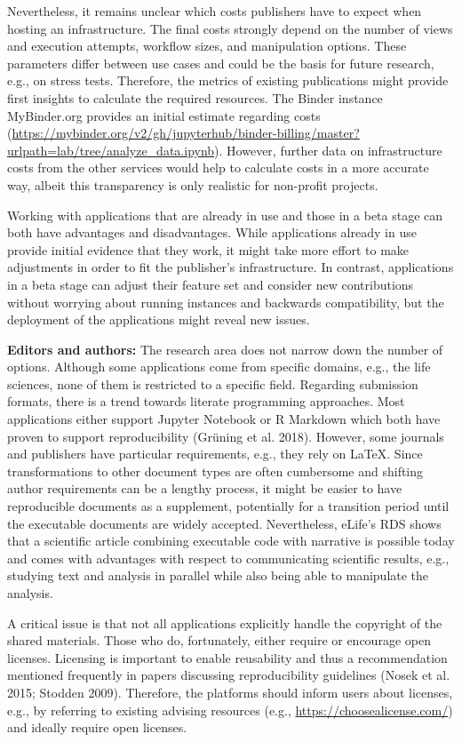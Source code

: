 \documentclass[onecolumn]{article}
\begin{document}
Nevertheless, it remains unclear which costs publishers have to expect
when hosting an infrastructure. The final costs strongly depend on the
number of views and execution attempts, workflow sizes, and manipulation
options. These parameters differ between use cases and could be the
basis for future research, e.g., on stress tests. Therefore, the metrics
of existing publications might provide first insights to calculate the
required resources. The Binder instance MyBinder.org provides an initial
estimate regarding costs
(\url{https://mybinder.org/v2/gh/jupyterhub/binder-billing/master?urlpath=lab/tree/analyze_data.ipynb}).
However, further data on infrastructure costs from the other services
would help to calculate costs in a more accurate way, albeit this
transparency is only realistic for non-profit projects.

Working with applications that are already in use and those in a beta
stage can both have advantages and disadvantages. While applications
already in use provide initial evidence that they work, it might take
more effort to make adjustments in order to fit the publisher's
infrastructure. In contrast, applications in a beta stage can adjust
their feature set and consider new contributions without worrying about
running instances and backwards compatibility, but the deployment of the
applications might reveal new issues.

\textbf{Editors and authors:} The research area does not narrow down the
number of options. Although some applications come from specific
domains, e.g., the life sciences, none of them is restricted to a
specific field. Regarding submission formats, there is a trend towards
literate programming approaches. Most applications either support
Jupyter Notebook or R Markdown which both have proven to support
reproducibility (Grüning et al. 2018). However, some journals and
publishers have particular requirements, e.g., they rely on LaTeX. Since
transformations to other document types are often cumbersome and
shifting author requirements can be a lengthy process, it might be
easier to have reproducible documents as a supplement, potentially for a
transition period until the executable documents are widely accepted.
Nevertheless, eLife's RDS shows that a scientific article combining
executable code with narrative is possible today and comes with
advantages with respect to communicating scientific results, e.g.,
studying text and analysis in parallel while also being able to
manipulate the analysis.

A critical issue is that not all applications explicitly handle the
copyright of the shared materials. Those who do, fortunately, either
require or encourage open licenses. Licensing is important to enable
reusability and thus a recommendation mentioned frequently in papers
discussing reproducibility guidelines (Nosek et al. 2015; Stodden 2009).
Therefore, the platforms should inform users about licenses, e.g., by
referring to existing advising resources (e.g.,
\url{https://choosealicense.com/}) and ideally require open licenses.
\end{document}
